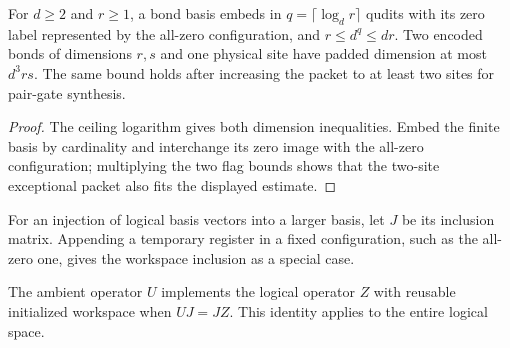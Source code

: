 \begin{lemma}
    \label{thm:mpu_encoded_bond_register_dimensions}
    \leanok
    For $d\geq2$ and $r\geq1$, a bond basis embeds in
    $q=\lceil\log_d r\rceil$ qudits with its zero label represented
    by the all-zero configuration, and
    $r\leq d^q\leq dr$. Two encoded bonds of dimensions $r,s$
    and one physical site have padded dimension at most $d^3rs$.
    The same bound holds after increasing the packet to at least
    two sites for pair-gate synthesis.
\end{lemma}
\begin{proof}\leanok
    The ceiling logarithm gives both dimension inequalities.
    Embed the finite basis by cardinality and interchange its
    zero image with the all-zero configuration; multiplying the
    two flag bounds shows that the two-site exceptional packet also fits
    the displayed estimate.
\end{proof}

\begin{definition}
    \label{def:mpu_initialized_basis_inclusion}
    \leanok
    For an injection of logical basis vectors into a larger basis,
    let $J$ be its inclusion matrix. Appending a temporary register
    in a fixed configuration, such as the all-zero one, gives the
    workspace inclusion as a special case.
\end{definition}

\begin{definition}
    \label{def:mpu_clean_unitary_implementation}
    \leanok
    The ambient operator $U$ implements the logical operator $Z$
    with reusable initialized workspace when $UJ=JZ$. This identity
    applies to the entire logical space.
\end{definition}

